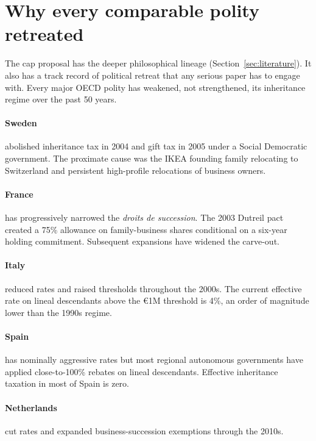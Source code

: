 \documentclass[11pt]{article}
\begin{document}
\section{Why every comparable polity retreated}
\label{sec:precedent}

The cap proposal has the deeper philosophical lineage
(Section~\ref{sec:literature}).  It also has a track record of
political retreat that any serious paper has to engage with.  Every
major OECD polity has weakened, not strengthened, its inheritance
regime over the past 50 years.

\paragraph{Sweden} abolished inheritance tax in 2004 and gift tax in
2005 under a Social Democratic government.  The proximate cause was
the IKEA founding family relocating to Switzerland and persistent
high-profile relocations of business owners.

\paragraph{France} has progressively narrowed the \emph{droits de
succession}.  The 2003 Dutreil pact created a 75\% allowance on
family-business shares conditional on a six-year holding commitment.
Subsequent expansions have widened the carve-out.

\paragraph{Italy} reduced rates and raised thresholds throughout the
2000s.  The current effective rate on lineal descendants above the
\euro 1M threshold is 4\%, an order of magnitude lower than the
1990s regime.

\paragraph{Spain} has nominally aggressive rates but most regional
autonomous governments have applied close-to-100\% rebates on
lineal descendants.  Effective inheritance taxation in most of
Spain is zero.

\paragraph{Netherlands} cut rates and expanded business-succession
exemptions through the 2010s.
\end{document}
